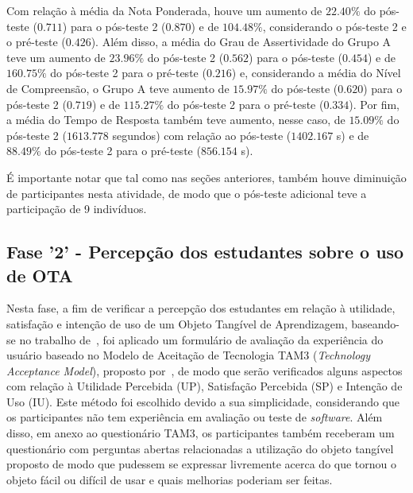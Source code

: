 Com relação à média da Nota Ponderada, houve um aumento de $22.40\%$ do pós-teste ($0.711$) para o pós-teste 2 ($0.870$) e de $104.48\%$, considerando o pós-teste 2 e o pré-teste ($0.426$). Além disso, a média do Grau de Assertividade do Grupo A teve um aumento de $23.96\%$ do pós-teste 2 ($0.562$) para o pós-teste ($0.454$) e de $160.75\%$ do pós-teste 2 para o pré-teste ($0.216$) e, considerando a média do Nível de Compreensão, o Grupo A teve aumento de $15.97\%$ do pós-teste ($0.620$) para o pós-teste 2 ($0.719$) e de $115.27\%$ do pós-teste 2 para o pré-teste ($0.334$). Por fim, a média do Tempo de Resposta também teve aumento, nesse caso, de $15.09\%$ do pós-teste 2 ($1613.778$ segundos) com relação ao pós-teste ($1402.167$ s) e de $88.49\%$ do pós-teste 2 para o pré-teste ($856.154$ s).

É importante notar que tal como nas seções anteriores, também houve diminuição de participantes nesta atividade, de modo que o pós-teste adicional teve a participação de 9 indivíduos.

\subsection{Fase '2' - Percepção dos estudantes sobre o uso de OTA}\label{subsec:fase2}

Nesta fase, a fim de verificar a percepção dos estudantes em relação à utilidade, satisfação e intenção de uso de um Objeto Tangível de Aprendizagem, baseando-se no trabalho de~\cite{marques:2019}, foi aplicado um formulário de avaliação da experiência do usuário baseado no Modelo de Aceitação de Tecnologia TAM3 (\textit{Technology Acceptance Model}), proposto por~\citep{Venkatesh:2008}, de modo que serão verificados alguns aspectos com relação à Utilidade Percebida (UP), Satisfação Percebida (SP) e Intenção de Uso (IU). Este método foi escolhido devido a sua simplicidade, considerando que os participantes não tem experiência em avaliação ou teste de \textit{software}. Além disso, em anexo ao questionário TAM3, os participantes também receberam um questionário com perguntas abertas relacionadas a utilização do objeto tangível proposto de modo que pudessem se expressar livremente acerca do que tornou o objeto fácil ou difícil de usar e quais melhorias poderiam ser feitas.

